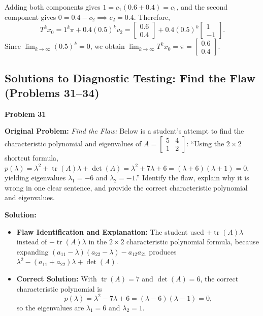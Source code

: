 \documentclass[11pt, letterpaper]{article}
\theoremstyle{definition}
\theoremstyle{remark}
\begin{document}
\begin{enumerate}[label=(\alph*), topsep=3pt, itemsep=4pt]
\[    \]
    Adding both components gives $1 = c_1(0.6 + 0.4) = c_1$, and the second component gives $0 = 0.4 - c_2 \implies c_2 = 0.4$. Therefore,
    \[
    T^k x_0 = 1^k \pi + 0.4(0.5)^k v_2 = \begin{bmatrix} 0.6 \\ 0.4 \end{bmatrix} + 0.4(0.5)^k\begin{bmatrix} 1 \\ -1 \end{bmatrix}.
    \]
    Since $\lim_{k \to \infty} (0.5)^k = 0$, we obtain $\lim_{k \to \infty} T^k x_0 = \pi = \begin{bmatrix} 0.6 \\ 0.4 \end{bmatrix}$.
\end{enumerate}

\subsection{Solutions to Diagnostic Testing: Find the Flaw (Problems 31--34)}

\noindent\textbf{Problem 31}

\textbf{Original Problem:} \textit{Find the Flaw:} Below is a student's attempt to find the characteristic polynomial and eigenvalues of $A = \begin{bmatrix} 5 & 4 \\ 1 & 2 \end{bmatrix}$: ``Using the $2 \times 2$ shortcut formula, $p(\lambda) = \lambda^2 + \operatorname{tr}(A)\lambda + \det(A) = \lambda^2 + 7\lambda + 6 = (\lambda + 6)(\lambda + 1) = 0$, yielding eigenvalues $\lambda_1 = -6$ and $\lambda_2 = -1$.'' Identify the flaw, explain why it is wrong in one clear sentence, and provide the correct characteristic polynomial and eigenvalues.

\textbf{Solution:}
\begin{itemize}[topsep=3pt, itemsep=3pt]
    \item \textbf{Flaw Identification and Explanation:} The student used $+\operatorname{tr}(A)\lambda$ instead of $-\operatorname{tr}(A)\lambda$ in the $2 \times 2$ characteristic polynomial formula, because expanding $(a_{11} - \lambda)(a_{22} - \lambda) - a_{12}a_{21}$ produces $\lambda^2 - (a_{11} + a_{22})\lambda + \det(A)$.
    \item \textbf{Correct Solution:} With $\operatorname{tr}(A) = 7$ and $\det(A) = 6$, the correct characteristic polynomial is
    \[
    p(\lambda) = \lambda^2 - 7\lambda + 6 = (\lambda - 6)(\lambda - 1) = 0,
    \]
    so the eigenvalues are $\lambda_1 = 6$ and $\lambda_2 = 1$.
\end{itemize}
\end{document}

